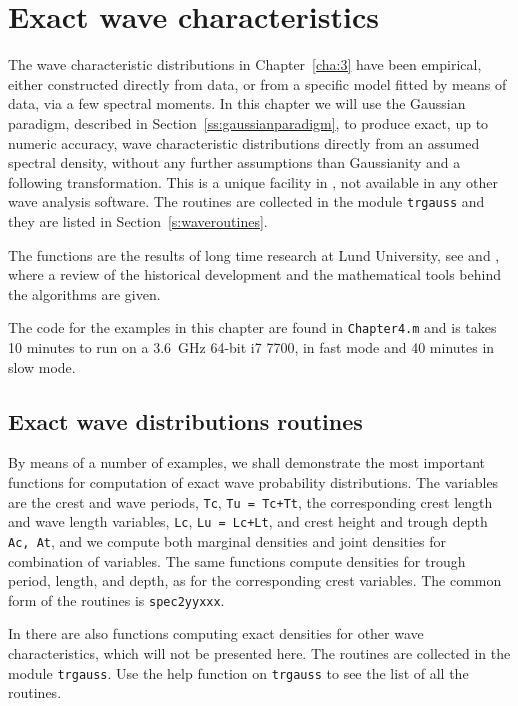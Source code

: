 %
\chapter[Exact wave characteristics]{%
Exact wave characteristics}
\label{cha:distr-appar-wave-exact}\label{cha:4}
The wave characteristic distributions in Chapter~\ref{cha:3} have been
empirical, either constructed directly from data, or from a specific
model fitted by means of data, via a few spectral moments.
In this chapter we will use the Gaussian
paradigm, described in Section~\ref{ss:gaussianparadigm}, to produce
exact, up to numeric accuracy,  wave characteristic distributions directly from an assumed spectral
density, without any further assumptions than Gaussianity and a following
transformation. This is a unique facility in \progname{}, not available
in any other wave analysis software. The routines are collected in the
module {\tt trgauss} and they are listed in Section~\ref{s:waveroutines}.

The functions are the results of long time research at Lund University,
see \cite{PodgorskiEtal2000Exact} and \cite{LindgrenAndBroberg2004Cycle},
where a review of the historical development and
the mathematical tools behind the algorithms are given.

The \ML{} code for the examples in this chapter
are found in \verb+Chapter4.m+ and
is takes 10 minutes to run on a 3.6~GHz 64-bit i7 7700, in fast mode and 
40 minutes in slow mode.

\section{Exact wave distributions routines}\label{sect4_2}
By means of a number of examples,
we shall demonstrate the most important functions for computation of
exact wave probability distributions. The variables are the crest and wave
periods, \verb+Tc+, \verb:Tu = Tc+Tt:, the corresponding crest length and
wave length variables, \verb+Lc+, \verb:Lu = Lc+Lt:, and crest height 
and trough depth \verb+Ac, At+, and we compute both marginal densities and
joint densities for combination of variables.
The same functions compute densities for trough period, length,
and depth, as for the corresponding crest variables.  The common form of the
routines is \verb+spec2yyxxx+.

In \progname{} there are also functions computing exact densities for
other wave characteristics, which will not be presented here.
The \progname{} routines are collected
in the module \verb+trgauss+. Use the help function on
\verb+trgauss+ to see the list of all the routines.

